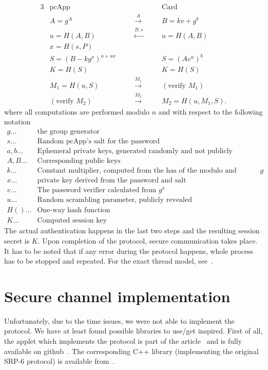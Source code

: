 \documentclass[12pt,a4paper]{article}
\begin{document}
\begin{alignat*}{3}
& \textrm{pcApp} \quad &&                                                         && \quad \textrm{Card} \\
& A = g^A && \quad \xrightarrow{A} && \quad B = kv + g^b \\
& u = H(A,B) && \quad \xleftarrow{B,s} && \quad u = H(A,B) \\
& x = H(s,P) && && \\
& S = (B - kg^x)^{a + ux} && && \quad S = (Av^u)^b \\
& K = H(S) && && \quad K = H(S) \\
& M_1 = H(u,S) && \quad \xrightarrow{M_1} && \quad (\textrm{verify } M_1) \\
& (\textrm{verify } M_2) && \quad \xrightarrow{M_2} && \quad M_2 = H(u, M_1, S).
\end{alignat*}
where all computations are performed modulo $n$ and with respect to the following notation
\begin{align*}
g \dots & \textrm{the group generator} \\
s \dots & \textrm{Random pcApp's salt for the password} \\
a, b \dots & \textrm{Ephemeral private keys, generated randomly and not publicly revealed} \\
A, B \dots & \textrm{Corresponding public keys} \\
k \dots & \textrm{Constant multiplier, computed from the has of the modulo and concatenated with } g \\
x \dots & \textrm{private key derived from the password and salt} \\
v \dots & \textrm{The password verifier calculated from } g^x \\
u \dots & \textrm{Random scrambling parameter, publicly revealed} \\
H() \dots & \textrm{One-way hash function} \\
K \dots & \textrm{Computed session key}
\end{align*}
The actual authentication happens in the last two steps and the resulting session secret is $K$. Upon completion of the protocol, secure communication takes place. It has to be noted that if any error during the protocol happens, whole process has to be stopped and repeated. For the exact thread model, see~\cite{srpjava}.
\section*{Secure channel implementation}
Unfortunately, due to the time issues, we were not able to implement the protocol. We have at least found possible libraries to use/get inspired. First of all, the applet which implements the protocol is part of the article~\cite{srpjava} and is fully available on github~\cite{appletgit}. The corresponding C++ library (implementing the original SRP-6 protocol) is available from~\cite{library}.
\end{document}
